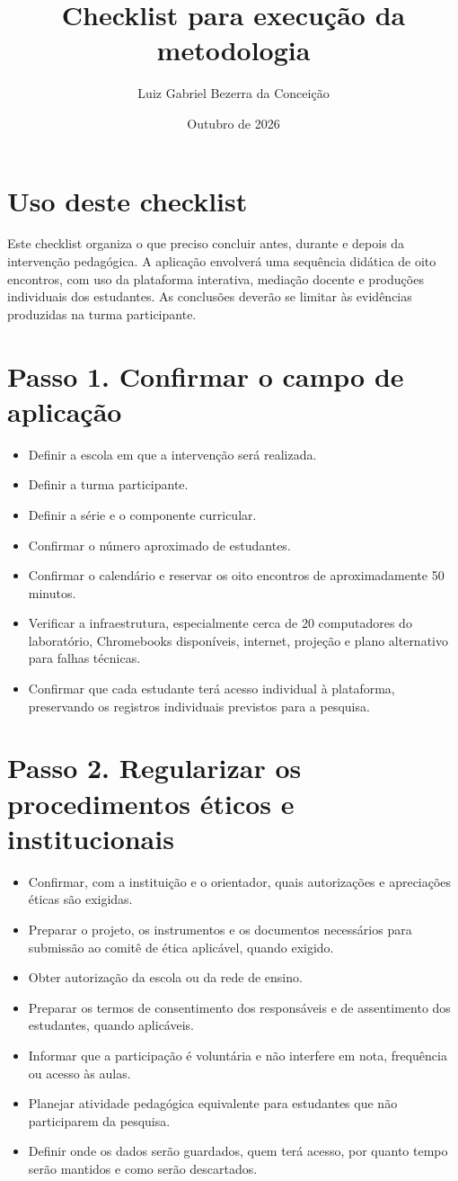 \documentclass[12pt,a4paper]{article}
\title{Checklist para execução da metodologia}
\author{Luiz Gabriel Bezerra da Conceição}
\date{Outubro de 2026}
\begin{document}
\maketitle

\section*{Uso deste checklist}

Este checklist organiza o que preciso concluir antes, durante e depois da intervenção pedagógica. A aplicação envolverá uma sequência didática de oito encontros, com uso da plataforma interativa, mediação docente e produções individuais dos estudantes. As conclusões deverão se limitar às evidências produzidas na turma participante.

\newcommand{\checkitem}[1]{\item[$\square$] #1}

\section*{Passo 1. Confirmar o campo de aplicação}

\begin{itemize}
    \checkitem{Definir a escola em que a intervenção será realizada.}
    \checkitem{Definir a turma participante.}
    \checkitem{Definir a série e o componente curricular.}
    \checkitem{Confirmar o número aproximado de estudantes.}
    \checkitem{Confirmar o calendário e reservar os oito encontros de aproximadamente 50 minutos.}
    \checkitem{Verificar a infraestrutura, especialmente cerca de 20 computadores do laboratório, Chromebooks disponíveis, internet, projeção e plano alternativo para falhas técnicas.}
    \checkitem{Confirmar que cada estudante terá acesso individual à plataforma, preservando os registros individuais previstos para a pesquisa.}
\end{itemize}

\section*{Passo 2. Regularizar os procedimentos éticos e institucionais}

\begin{itemize}
    \checkitem{Confirmar, com a instituição e o orientador, quais autorizações e apreciações éticas são exigidas.}
    \checkitem{Preparar o projeto, os instrumentos e os documentos necessários para submissão ao comitê de ética aplicável, quando exigido.}
    \checkitem{Obter autorização da escola ou da rede de ensino.}
    \checkitem{Preparar os termos de consentimento dos responsáveis e de assentimento dos estudantes, quando aplicáveis.}
    \checkitem{Informar que a participação é voluntária e não interfere em nota, frequência ou acesso às aulas.}
    \checkitem{Planejar atividade pedagógica equivalente para estudantes que não participarem da pesquisa.}
    \checkitem{Definir onde os dados serão guardados, quem terá acesso, por quanto tempo serão mantidos e como serão descartados.}
\end{itemize}
\end{document}
